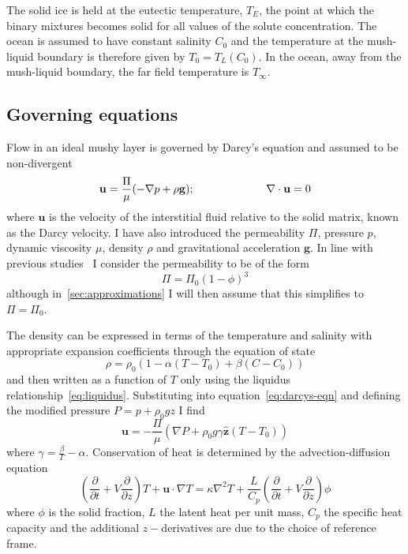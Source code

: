 \documentclass[11pt]{proc}
\begin{document}
The solid ice is held at the eutectic temperature, $T_E$, the point at which the binary mixtures becomes solid for all values of the solute concentration. The ocean is assumed to have constant salinity $C_0$ and the temperature at the mush-liquid boundary is therefore given by $T_0 = T_L(C_0)$. In the ocean, away from the mush-liquid boundary, the far field temperature is $T_\infty$.

\subsection{Governing equations}
Flow in an ideal mushy layer is governed by Darcy's equation and assumed to be non-divergent
\begin{equation}
\label{eq:darcys-eqn}
 \mathbf{u} = \frac{\Pi}{\mu} (- \nabla p + \rho \mathbf{g}); \hspace{15ex} \nabla \cdot \mathbf{u} = 0
\end{equation}
where $\mathbf{u}$ is the velocity of the interstitial fluid relative to the solid matrix, known as the Darcy velocity. I have also introduced the permeability $\Pi$, pressure $p$, dynamic viscosity $\mu$, density $\rho$ and gravitational acceleration $\mathbf{g}$. In line with previous studies~\citep*{schulze-worster-98,chung-worster-02} I consider the permeability to be of the form
\begin{equation}
\label{eq:permeability}
\Pi = \Pi_0 (1-\phi)^3
\end{equation}
although in~\autoref{sec:approximations} I will then assume that this simplifies to $\Pi = \Pi_0$.

The density can be expressed in terms of the temperature and salinity with appropriate expansion coefficients through the equation of state
\begin{equation}
\rho = \rho_0 (1-\alpha (T-T_0) + \beta (C-C_0))
\end{equation}
and then written as a function of $T$ only using the liquidus relationship~\eqref{eq:liquidus}. Substituting into equation~\eqref{eq:darcys-eqn} and defining the modified pressure $P = p + \rho_0 gz$ I find
\begin{equation}
\label{eq:darcys-equation-T}
\mathbf{u} =- \frac{\Pi}{\mu} (\nabla P + \rho_0 g \gamma \mathbf{\hat{z}} (T-T_0) )
\end{equation}
where $\gamma =  \frac{\beta}{\Gamma} - \alpha$. 
Conservation of heat is determined by the advection-diffusion equation
\begin{equation}
\label{eq:heat-conservation}
\left( \frac{\partial}{\partial t} + V\frac{\partial}{\partial z}\right) T + \mathbf{u} \cdot \nabla T = \kappa \nabla^2 T  + \frac{L}{C_p} \left( \frac{\partial}{\partial t} + V\frac{\partial}{\partial z} \right) \phi
\end{equation}
where $\phi$ is the solid fraction, $L$ the latent heat per unit mass, $C_p$ the specific heat capacity and the additional $z-$derivatives are due to the choice of reference frame. 
\end{document}
